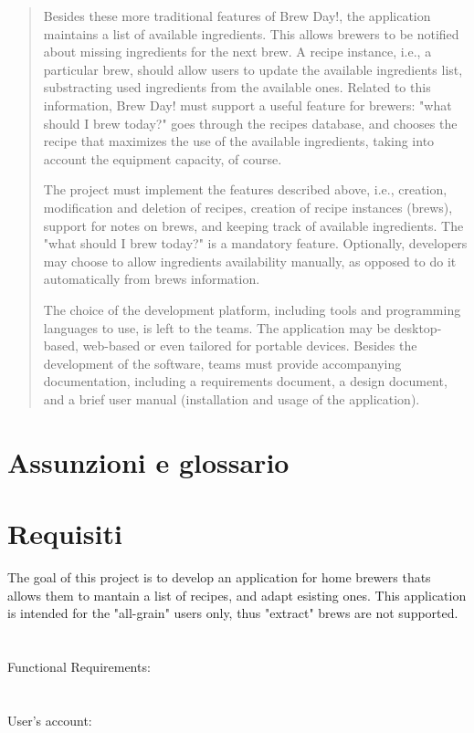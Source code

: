 \documentclass[12pt]{article}
\begin{document}
\begin{abstract}
Besides these more traditional features of Brew Day!, the application maintains a list of available ingredients. This allows brewers to be notified about missing ingredients for the next brew. A recipe instance, i.e., a particular brew, should allow users to update the available ingredients list, substracting used ingredients from the available ones. Related to this information, Brew Day! must support a useful feature for brewers: "what should I brew today?" goes through the recipes database, and chooses the recipe that maximizes the use of the available ingredients, taking into account the equipment capacity, of course.

The project must implement the features described above, i.e., creation, modification and deletion of recipes, creation of recipe instances (brews), support for notes on brews, and keeping track of available ingredients. The "what should I brew today?" is a mandatory feature. Optionally, developers may choose to allow ingredients availability manually, as opposed to do it automatically from brews information.

The choice of the development platform, including tools and programming languages to use, is left to the teams. The application may be desktop-based, web-based or even tailored for portable devices. Besides the development of the software, teams must provide accompanying documentation, including a requirements document, a design document, and a brief user manual (installation and usage of the application).

\end{abstract}
\section{Assunzioni e glossario}
\section{Requisiti}

The goal of this project is to develop an application for home brewers thats allows them to mantain a list of recipes, and adapt esisting ones.
This application is intended for the "all-grain" users only, thus "extract" brews are not supported. \\\
\\
\\
Functional Requirements:\\
\\
\\
User's account:
\end{document}
